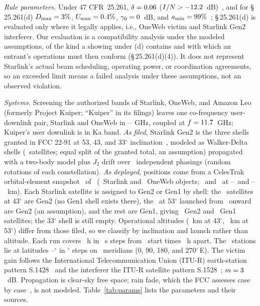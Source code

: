 \documentclass[conference]{IEEEtran}
\begin{document}
\emph{Rule parameters.} Under 47 CFR~25.261, $\delta = 0.06$
($I/N > -12.2$~dB)~\cite{cfr25261}, and for \S\,25.261(d)
$D_{\max} = 3\%$, $U_{\max} = 0.4\%$,
$\gamma_0 = 0$~dB, and $a_{\min} = 99\%$~\cite{fcc24117};
\S\,25.261(d) is evaluated only where it legally applies, i.e., OneWeb victim and
Starlink Gen2 interferer. Our evaluation is a compatibility analysis under the
modeled assumptions, of the kind a showing under (d) contains and with which an
entrant's operations must then conform (\S\,25.261(d)(4)). It does not represent
Starlink's actual beam scheduling, operating power, or coordination agreements,
so an exceeded limit means a failed analysis under these assumptions, not an
observed violation.

\emph{Systems.} Screening the authorized bands of Starlink, OneWeb, and Amazon Leo
(formerly Project Kuiper; ``Kuiper'' in its filings) leaves one co-frequency
user-downlink pair, Starlink and OneWeb in \SharedBandLoGhz--\SharedBandHiGhz~GHz,
coupled at $f = 11.7$~GHz; Kuiper's user downlink is in Ka band.
\emph{As filed}, Starlink Gen2 is the three shells granted in FCC 22-91 at
53, 43, and 33$^\circ$ inclination~\cite{fcc2291}, modeled as
Walker-Delta shells (\FilGenTwoNSats\ satellites; equal split of the granted
total, an assumption) propagated with a two-body model plus $J_2$ drift over
\EventNPhasings\ independent phasings (random rotations of each constellation).
\emph{As deployed}, positions come from a CelesTrak orbital-element
snapshot~\cite{celestrak} of \SnapshotDate\ (\NStarlinkRaw\ Starlink and
\NOnewebRaw\ OneWeb objects; \NStarlinkOperational\ and \NOnewebOp\ at
\OpAltStarlinkLoKm--\OpAltStarlinkHiKm\ and \OpAltOnewebLoKm--\OpAltOnewebHiKm~km).
Each Starlink satellite is assigned to Gen2 or Gen1 by shell: the
\NSatsFortyThree\ satellites at 43$^\circ$ are Gen2 (no Gen1 shell exists
there), the \NSatsFiftyThreeGenTwo\ at 53$^\circ$ launched from
\GenTwoLaunchCutoff\ onward are Gen2 (an assumption), and the rest are Gen1,
giving \NStarlinkGenTwo\ Gen2 and \NStarlinkGenOne\ Gen1 satellites; the
33$^\circ$ shell is still empty. Operational altitudes
(\AltFortyThreeMedKm~km at 43$^\circ$, \AltFiftyThreeGenTwoMedKm~km at
53$^\circ$) differ from those filed, so we classify by inclination and
launch rather than altitude. Each run covers \DurationH~h in \TimeStepS~s steps
from \NStartTimes\ start times \StartSpacingH~h apart. The \NStations\ stations
lie at latitudes \LatMinDeg--\LatMaxDeg$^\circ$ in \LatStepDeg$^\circ$ steps on
\NLongitudes\ meridians (0, 90, 180, and 270$^\circ$\,E). The victim gain follows the International
Telecommunication Union (ITU-R) earth-station pattern S.1428~\cite{itu1428} and
the interferer the ITU-R satellite pattern S.1528~\cite{itu1528};
$m = 3$~dB. Propagation is clear-sky free space; rain fade, which the
FCC assesses case by case~\cite{fcc24117}, is not modeled. Table~\ref{tab:params}
lists the parameters and their sources.
\end{document}
